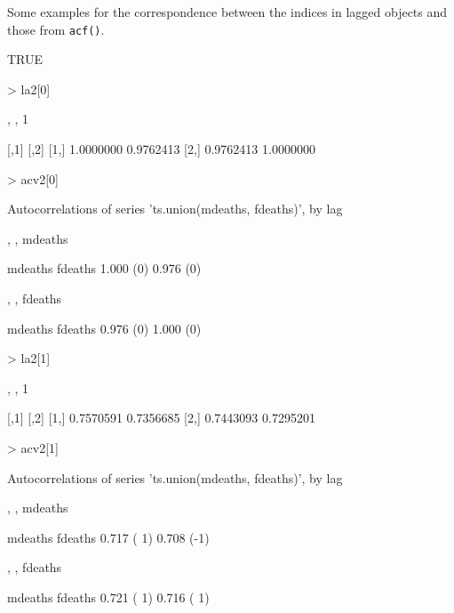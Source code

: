 \documentclass[a4paper,twoside,11pt,nojss,article]{jss}
\begin{document}
Some examples for the correspondence between the indices in lagged objects and those from
\texttt{acf()}.
\begin{Schunk}
\begin{Soutput}
[1] TRUE
\end{Soutput}
\begin{Sinput}
> la2[0]
\end{Sinput}
\begin{Soutput}
, , 1

          [,1]      [,2]
[1,] 1.0000000 0.9762413
[2,] 0.9762413 1.0000000
\end{Soutput}
\begin{Sinput}
> acv2[0]
\end{Sinput}
\begin{Soutput}
Autocorrelations of series 'ts.union(mdeaths, fdeaths)', by lag

, , mdeaths

 mdeaths   fdeaths  
 1.000 (0) 0.976 (0)

, , fdeaths

 mdeaths   fdeaths  
 0.976 (0) 1.000 (0)
\end{Soutput}
\begin{Sinput}
> la2[1]
\end{Sinput}
\begin{Soutput}
, , 1

          [,1]      [,2]
[1,] 0.7570591 0.7356685
[2,] 0.7443093 0.7295201
\end{Soutput}
\begin{Sinput}
> acv2[1]
\end{Sinput}
\begin{Soutput}
Autocorrelations of series 'ts.union(mdeaths, fdeaths)', by lag

, , mdeaths

 mdeaths    fdeaths   
 0.717 ( 1) 0.708 (-1)

, , fdeaths

 mdeaths    fdeaths   
 0.721 ( 1) 0.716 ( 1)
\end{Soutput}
\end{Schunk}
\end{document}

